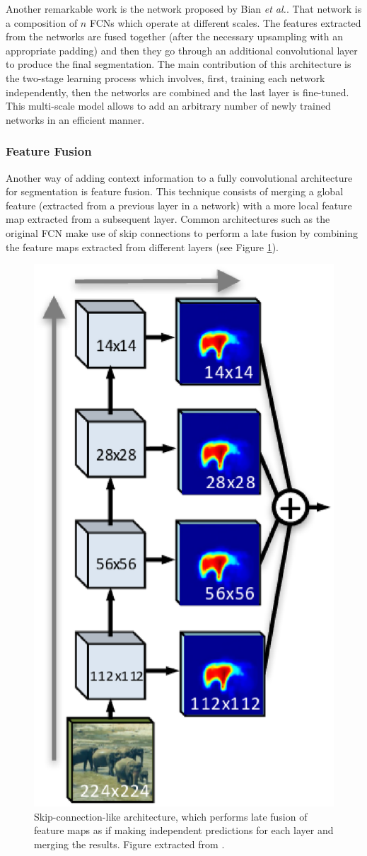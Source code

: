 Another remarkable work is the network proposed by Bian \emph{et al.}\cite{Bian2016}. That network is a composition of $n$ \acp{FCN} which operate at different scales. The features extracted from the networks are fused together (after the necessary upsampling with an appropriate padding) and then they go through an additional convolutional layer to produce the final segmentation. The main contribution of this architecture is the two-stage learning process which involves, first, training each network independently, then the networks are combined and the last layer is fine-tuned. This multi-scale model allows to add an arbitrary number of newly trained networks in an efficient manner.

\subsubsection{Feature Fusion}

Another way of adding context information to a fully convolutional architecture for segmentation is feature fusion. This technique consists of merging a global feature (extracted from a previous layer in a network) with a more local feature map extracted from a subsequent layer. Common architectures such as the original \acs{FCN} make use of skip connections to perform a late fusion by combining the feature maps extracted from different layers (see Figure \ref{fig:semseg:skipconnections}).

\begin{figure}[!hbt]
	\centering
	\includegraphics[width=0.45\linewidth]{Figures/Segmentation/sharpmaskskip.eps}
	\caption{Skip-connection-like architecture, which performs late fusion of feature maps as if making independent predictions for each layer and merging the results. Figure extracted from \cite{Pinheiro2016}.}
	\label{fig:semseg:skipconnections}
\end{figure}

